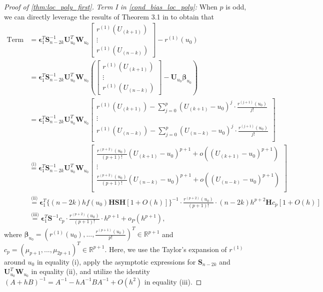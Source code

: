 \documentclass{uwstat572}
\theoremstyle{definition}
\theoremstyle{theorem}
\begin{document}
\begin{proof}[Proof of \autoref{thm:loc_poly_first}]
\emph{Term I in \eqref{cond_bias_loc_poly}:} When $p$ is odd, we can directly leverage the results of Theorem 3.1 in \cite{fan1996local} to obtain that
\begin{align*}
\text{Term I} &= \bm{\epsilon}_1^T \bm{S}_{n-2k}^{-1} \bm{U}_{u_0}^T \bm{W}_{u_0} \begin{bmatrix}
	r^{(1)}(U_{(k+1)})\\
	\vdots\\
	r^{(1)}(U_{(n-k)})
\end{bmatrix} -r^{(1)}(u_0) \\
&= \bm{\epsilon}_1^T \bm{S}_{n-2k}^{-1} \bm{U}_{u_0}^T \bm{W}_{u_0} \left(\begin{bmatrix}
	r^{(1)}(U_{(k+1)})\\
	\vdots\\
	r^{(1)}(U_{(n-k)})
\end{bmatrix} - \bm{U}_{u_0} \bm{\beta}_{u_0}\right)\\
&= \bm{\epsilon}_1^T \bm{S}_{n-2k}^{-1} \bm{U}_{u_0}^T \bm{W}_{u_0} \begin{bmatrix}
r^{(1)}(U_{(k+1)}) - \sum_{j=0}^p \left(U_{(k+1)} - u_0\right)^j \cdot \frac{r^{(j+1)}(u_0)}{j!}\\
\vdots\\
r^{(1)}(U_{(n-k)}) - \sum_{j=0}^p \left(U_{(n-k)} - u_0\right)^j \cdot \frac{r^{(j+1)}(u_0)}{j!}\\
\end{bmatrix}\\
&\stackrel{\text{(i)}}{=} \bm{\epsilon}_1^T \bm{S}_{n-2k}^{-1} \bm{U}_{u_0}^T \bm{W}_{u_0} 
\begin{bmatrix}
\frac{r^{(p+2)}(u_0)}{(p+1)!} (U_{(k+1)}- u_0)^{p+1} + o\left((U_{(k+1)} -u_0)^{p+1}\right)\\
\vdots\\
\frac{r^{(p+2)}(u_0)}{(p+1)!} (U_{(n-k)}- u_0)^{p+1} + o\left((U_{(n-k)} -u_0)^{p+1}\right)\\
\end{bmatrix}\\
&\stackrel{\text{(ii)}}{=} \bm{\epsilon}_1^T \big\{(n-2k)h f(u_0) \bm{H}\bm{S}\bm{H}\left[1 + O(h)\right]\big\}^{-1} \cdot\frac{r^{(p+2)}(u_0)}{(p+1)!} \cdot (n-2k)h^{p+2}\bm{H} c_p \left[1+O(h)\right]\\
&\stackrel{\text{(iii)}}{=} \bm{\epsilon}_1^T \bm{S}^{-1}c_p \cdot \frac{r^{(p+2)}(u_0)}{(p+1)!} \cdot h^{p+1} + o_P\left(h^{p+1}\right),
\end{align*}
where $\bm{\beta}_{u_0}=\left(r^{(1)}(u_0),...,\frac{r^{(p+1)}(u_0)}{p!}  \right)^T \in \mathbb{R}^{p+1}$ and $c_p=\left(\mu_{p+1},...,\mu_{2p+1} \right)^T\in \mathbb{R}^{p+1}$. Here, we use the Taylor's expansion of $r^{(1)}$ around $u_0$ in equality (i), apply the asymptotic expressions for $\bm{S}_{n-2k}$ and $\bm{U}_{u_0}^T \bm{W}_{u_0}$ in equality (ii), and utilize the identity $(A+hB)^{-1} = A^{-1} - hA^{-1} B A^{-1} + O(h^2)$ in equality (iii).


\end{proof}
\end{document}
